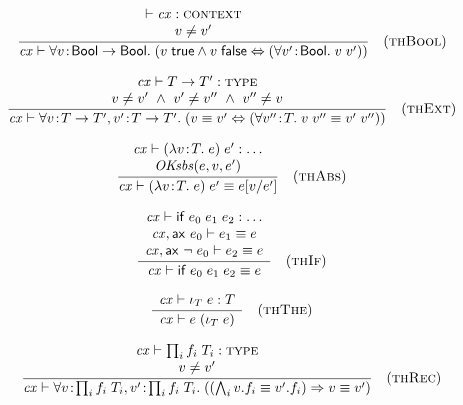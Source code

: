 \[
\frac{\begin{array}{c}\vdash\mathit{cx}:\textsc{context}\\v\neq v'\end{array}}{\mathit{cx}\vdash\forall v\!:\!\mathsf{Bool}\to\mathsf{Bool}.\;(v\;\mathsf{true}\wedge v\;\mathsf{false}\Leftrightarrow(\forall v'\!:\!\mathsf{Bool}.\;v\;v'))}\quad\mbox{(\textsc{thBool})}
\]


\[
\frac{\begin{array}{c}\mathit{cx}\vdash T\to T':\textsc{type}\\v\neq v'\ \wedge\ v'\neq v''\ \wedge\ v''\neq v\end{array}}{\mathit{cx}\vdash\forall v\!:\!T\to T',v'\!:\!T\to T'.\;(v\equiv v'\Leftrightarrow(\forall v''\!:\!T.\;v\;v''\equiv v'\;v''))}\quad\mbox{(\textsc{thExt})}
\]

\[
\frac{\begin{array}{c}\mathit{cx}\vdash(\lambda v\!:\!T.\;e)\;e':\ldots\\\mathit{OKsbs}(e,v,e')\end{array}}{\mathit{cx}\vdash(\lambda v\!:\!T.\;e)\;e'\equiv e[v/e']}\quad\mbox{(\textsc{thAbs})}
\]

\[
\frac{\begin{array}{c}\mathit{cx}\vdash\mathsf{if}\;e_0\;e_1\;e_2:\ldots\\\mathit{cx},\mathsf{ax}\ e_0\vdash e_1\equiv e\\\mathit{cx},\mathsf{ax}\ \neg\;e_0\vdash e_2\equiv e\end{array}}{\mathit{cx}\vdash\mathsf{if}\;e_0\;e_1\;e_2\equiv e}\quad\mbox{(\textsc{thIf})}
\]

\[
\frac{\begin{array}{c}\mathit{cx}\vdash\iota_{T}\;e:T\end{array}}{\mathit{cx}\vdash e\;(\iota_{T}\;e)}\quad\mbox{(\textsc{thThe})}
\]

\[
\frac{\begin{array}{c}\mathit{cx}\vdash\prod_{i}f_i\;T_i:\textsc{type}\\v\neq v'\end{array}}{\mathit{cx}\vdash\forall v\!:\!\prod_{i}f_i\;T_i,v'\!:\!\prod_{i}f_i\;T_i.\;((\bigwedge_{i}v.f_i\equiv v'.f_i)\Rightarrow v\equiv v')}\quad\mbox{(\textsc{thRec})}
\]



